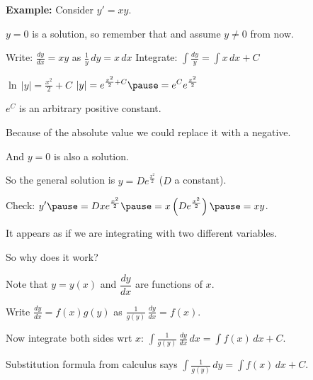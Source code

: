 \documentclass[10pt,aspectratio=169]{beamer}
\begin{document}
\begin{frame}

\textbf{Example:}
Consider
$y' = xy$.

\medskip
\pause

$y=0$ is a solution, so remember that and assume $y \neq 0$ from now.

\medskip
\pause

Write:
\qquad $\displaystyle \frac{dy}{dx} = xy$
\quad as \quad
$\displaystyle \frac{1}{y}\, dy = x \, dx$
\pause
\qquad Integrate:
$\displaystyle
\int \frac{dy}{y} = \int x\,dx + C$

\medskip
\pause

\thus
\quad
$\displaystyle
\ln \, \lvert y\rvert = \frac{x^2}{2} + C$
\pause
\wthus
$\displaystyle \lvert y \rvert = e^{\frac{x^2}{2} + C}
\pause
 = e^C e^{\frac{x^2}{2}}$

\medskip
\pause

$e^C$ is an arbitrary positive constant.

\pause
Because of the absolute value we could replace it with a negative.

\pause
And $y=0$ is also a solution.

\medskip
\pause

So the general solution is \quad $\displaystyle y = D e^{\frac{x^2}{2}}$
\quad ($D$ a constant).

\medskip
\pause

Check:
$\displaystyle
y' \pause = D x e^{\frac{x^2}{2}} \pause = x \left( D e^{\frac{x^2}{2}}
\right) \pause = xy$.
\qquad
{\Large\checkmark}
\end{frame}

\begin{frame}
It appears as if we are integrating with two different variables.

\medskip
\pause

So why does it work?

\medskip
\pause

Note that $y=y(x)$ and $\dfrac{dy}{dx}$ are functions of $x$.

\medskip
\pause

Write
\quad
$\displaystyle \frac{dy}{dx} = f(x)g(y)$
\quad
as
\quad
$\displaystyle
\frac{1}{g(y)}\,\frac{dy}{dx} = f(x)$.

\medskip
\pause

Now integrate both sides wrt $x$:
\quad
$\displaystyle
\int \frac{1}{g(y)}\,\frac{dy}{dx} \,dx = \int f(x) \,dx + C$.

\medskip
\pause

Substitution formula from calculus says
\quad $\displaystyle
\int \frac{1}{g(y)}\,dy = \int f(x) \,dx + C$.
\quad
{\Large\checkmark}

\end{frame}
\end{document}
